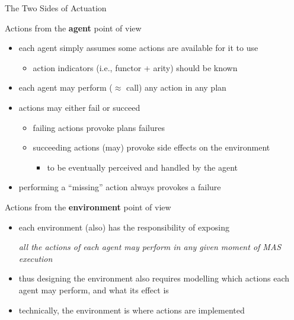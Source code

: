 \documentclass[presentation]{beamer}\mode<presentation>{\usetheme{AMSBolognaFC}}
\begin{document}
\begin{frame}[c,allowframebreaks]{The Two Sides of Actuation}
    
    \begin{block}{Actions from the \textbf{agent} point of view}
        \begin{itemize}
            \item each agent simply \alert{assumes} some actions are available for it to use
            \begin{itemize}
                \item action \alert{indicators} (i.e., functor + arity) should be known
            \end{itemize}
            
            \item each agent may \alert{perform} ($\approx$ call) any action in any plan
            
            \item actions may either \alert{fail or succeed}
            \begin{itemize}
                \item failing actions provoke \alert{plans failures}
                \item succeeding actions (may) provoke \alert{side effects} on the environment
                \begin{itemize}
                    \item to be eventually perceived and handled by the agent
                \end{itemize}
            \end{itemize}
            
            \item performing a ``missing'' action always provokes a failure
        \end{itemize}
    \end{block}
    
    \framebreak
    
    \begin{block}{Actions from the \textbf{environment} point of view}
        \begin{itemize}
            \item each environment (also) has the \alert{responsibility} of exposing 
            \begin{center}\small\itshape
                \alert{all} the actions of \alert{each} agent may perform in \alert{any} given moment of MAS execution
            \end{center}
            
            \item thus designing the environment also requires modelling \alert{which} actions each agent may perform, and what its \alert{effect} is
            
            \item technically, the environment is where actions are implemented
        \end{itemize}
    \end{block}
    
\end{frame} 
\end{document}
